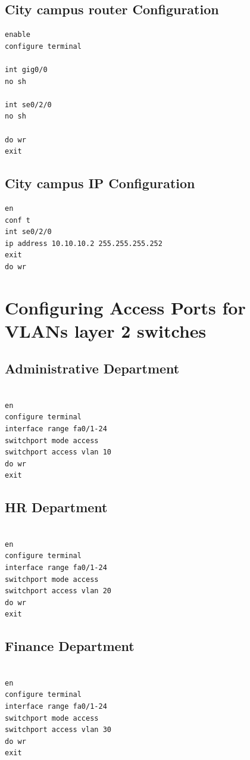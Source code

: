\documentclass[12pt]{article}
\begin{document}
\subsection{City campus router Configuration}
\begin{verbatim}
enable
configure terminal

int gig0/0
no sh

int se0/2/0
no sh

do wr
exit
\end{verbatim}

\subsection{City campus IP Configuration}
\begin{verbatim}
en
conf t
int se0/2/0
ip address 10.10.10.2 255.255.255.252 
exit
do wr
\end{verbatim}

\section{Configuring Access Ports for VLANs layer 2 switches}
\subsection{Administrative Department}
\begin{verbatim}

en 
configure terminal
interface range fa0/1-24
switchport mode access
switchport access vlan 10
do wr
exit
\end{verbatim}

\subsection{HR Department}
\begin{verbatim}

en 
configure terminal
interface range fa0/1-24
switchport mode access
switchport access vlan 20
do wr
exit
\end{verbatim}

\subsection{Finance Department}
\begin{verbatim}

en 
configure terminal
interface range fa0/1-24
switchport mode access
switchport access vlan 30
do wr
exit
\end{verbatim}
\end{document}
